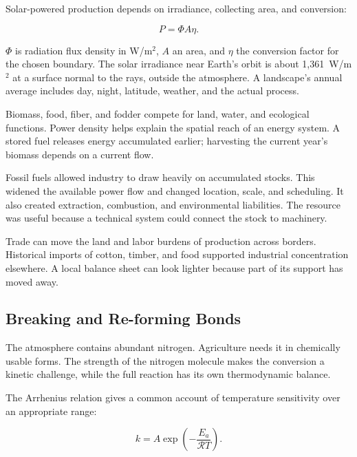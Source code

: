 
Solar-powered production depends on irradiance, collecting area, and conversion:

\begin{equation}
P=\Phi A\eta.
\end{equation}

$\Phi$ is radiation flux density in W/m$^2$, $A$ an area, and $\eta$ the conversion factor for the chosen boundary. The solar irradiance near Earth's orbit is about 1,361~W/m$^2$ at a surface normal to the rays, outside the atmosphere.\cite{prsa2016nominal} A landscape's annual average includes day, night, latitude, weather, and the actual process.

Biomass, food, fiber, and fodder compete for land, water, and ecological functions. Power density helps explain the spatial reach of an energy system.\cite{smil2015power} A stored fuel releases energy accumulated earlier; harvesting the current year's biomass depends on a current flow.

Fossil fuels allowed industry to draw heavily on accumulated stocks. This widened the available power flow and changed location, scale, and scheduling. It also created extraction, combustion, and environmental liabilities. The resource was useful because a technical system could connect the stock to machinery.

Trade can move the land and labor burdens of production across borders. Historical imports of cotton, timber, and food supported industrial concentration elsewhere. A local balance sheet can look lighter because part of its support has moved away.

\subsection{Breaking and Re-forming Bonds}


The atmosphere contains abundant nitrogen. Agriculture needs it in chemically usable forms. The strength of the nitrogen molecule makes the conversion a kinetic challenge, while the full reaction has its own thermodynamic balance.\cite{erisman2008how,jia2014mechanistic}

The Arrhenius relation gives a common account of temperature sensitivity over an appropriate range:

\begin{equation}
k=A\exp\left(-\frac{E_a}{\mathcal RT}\right).
\label{eq:arrhenius}
\end{equation}

